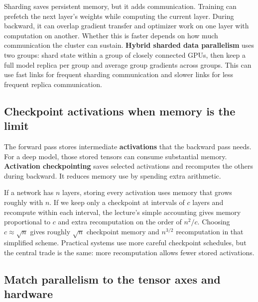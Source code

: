 Sharding saves persistent memory, but it adds communication. Training can prefetch the next layer's weights while computing the current layer. During backward, it can overlap gradient transfer and optimizer work on one layer with computation on another. Whether this is faster depends on how much communication the cluster can sustain. \textbf{Hybrid sharded data parallelism} uses two groups: shard state within a group of closely connected GPUs, then keep a full model replica per group and average group gradients across groups. This can use fast links for frequent sharding communication and slower links for less frequent replica communication.

\subsection{Checkpoint activations when memory is the limit}\label{04-visual-computing-ii-ch031-checkpoint-activations-when-memory-is-the-limit}

\hypertarget{04-visual-computing-ii-ch031-checkpoint-activations-when-memory-is-the-limit}{}

The forward pass stores intermediate \textbf{activations} that the backward pass needs. For a deep model, those stored tensors can consume substantial memory. \textbf{Activation checkpointing} saves selected activations and recomputes the others during backward. It reduces memory use by spending extra arithmetic.

If a network has \(n\) layers, storing every activation uses memory that grows roughly with \(n\). If we keep only a checkpoint at intervals of \(c\) layers and recompute within each interval, the lecture's simple accounting gives memory proportional to \(c\) and extra recomputation on the order of \(n^2/c\). Choosing \(c\approx\sqrt n\) gives roughly \(\sqrt n\) checkpoint memory and \(n^{3/2}\) recomputation in that simplified scheme. Practical systems use more careful checkpoint schedules, but the central trade is the same: more recomputation allows fewer stored activations.

\subsection{Match parallelism to the tensor axes and hardware}\label{04-visual-computing-ii-ch031-match-parallelism-to-the-tensor-axes-and-hardware}

\hypertarget{04-visual-computing-ii-ch031-match-parallelism-to-the-tensor-axes-and-hardware}{}

